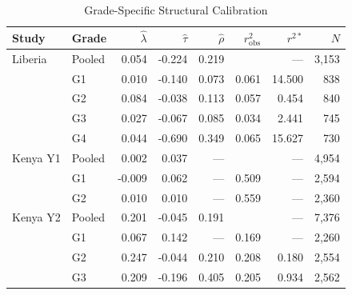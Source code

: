 \begin{table}[htbp]
\centering\small
\caption{Grade-Specific Structural Calibration}
\label{tab:calib_grade}
\begin{tabular}{llrrrrrr}
\toprule
Study & Grade & $\hat{\lambda}$ & $\hat{\tau}$ & $\hat{\rho}$ & $r^2_{\text{obs}}$ & $r^{2*}$ & $N$ \\
\midrule
Liberia & Pooled & 0.054 & -0.224 & 0.219 &  & --- & 3,153 \\
 & G1 & 0.010 & -0.140 & 0.073 & 0.061 & 14.500 & 838 \\
 & G2 & 0.084 & -0.038 & 0.113 & 0.057 & 0.454 & 840 \\
 & G3 & 0.027 & -0.067 & 0.085 & 0.034 & 2.441 & 745 \\
 & G4 & 0.044 & -0.690 & 0.349 & 0.065 & 15.627 & 730 \\
\addlinespace
Kenya Y1 & Pooled & 0.002 & 0.037 & --- &  & --- & 4,954 \\
 & G1 & -0.009 & 0.062 & --- & 0.509 & --- & 2,594 \\
 & G2 & 0.010 & 0.010 & --- & 0.559 & --- & 2,360 \\
\addlinespace
Kenya Y2 & Pooled & 0.201 & -0.045 & 0.191 &  & --- & 7,376 \\
 & G1 & 0.067 & 0.142 & --- & 0.169 & --- & 2,260 \\
 & G2 & 0.247 & -0.044 & 0.210 & 0.208 & 0.180 & 2,554 \\
 & G3 & 0.209 & -0.196 & 0.405 & 0.205 & 0.934 & 2,562 \\
\bottomrule
\end{tabular}
\par\smallskip{}
\end{table}